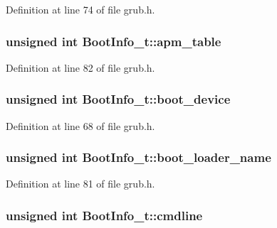 Definition at line 74 of file grub.\+h.

\hypertarget{structBootInfo__t_a1ce55d9a9d425ccbc6c447a8d73ffdba}{
\subsubsection[{apm\+\_\+table}]{\setlength{\rightskip}{0pt plus 5cm}unsigned int Boot\+Info\+\_\+t\+::apm\+\_\+table}}\label{structBootInfo__t_a1ce55d9a9d425ccbc6c447a8d73ffdba}


Definition at line 82 of file grub.\+h.

\hypertarget{structBootInfo__t_a11fa989df3074f1a90fcb646aa434b97}{
\subsubsection[{boot\+\_\+device}]{\setlength{\rightskip}{0pt plus 5cm}unsigned int Boot\+Info\+\_\+t\+::boot\+\_\+device}}\label{structBootInfo__t_a11fa989df3074f1a90fcb646aa434b97}


Definition at line 68 of file grub.\+h.

\hypertarget{structBootInfo__t_a49973d2d24c8f4159b125f2fe0a42e3d}{
\subsubsection[{boot\+\_\+loader\+\_\+name}]{\setlength{\rightskip}{0pt plus 5cm}unsigned int Boot\+Info\+\_\+t\+::boot\+\_\+loader\+\_\+name}}\label{structBootInfo__t_a49973d2d24c8f4159b125f2fe0a42e3d}


Definition at line 81 of file grub.\+h.

\hypertarget{structBootInfo__t_a23d97e399056fd818fdd31ceb1a07f42}{
\subsubsection[{cmdline}]{\setlength{\rightskip}{0pt plus 5cm}unsigned int Boot\+Info\+\_\+t\+::cmdline}}\label{structBootInfo__t_a23d97e399056fd818fdd31ceb1a07f42}


